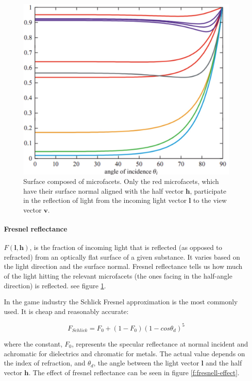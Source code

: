 \begin{figure}
\sidecaption
	\includegraphics[width=.65\textwidth]{graphics/gi/ray-optics-11}
	\caption{Surface composed of microfacets. Only the red microfacets, which have their surface normal aligned with the half vector $\mathbf{h}$, participate in the reflection of light from the incoming light vector $\mathbf{l}$ to the view vector $\mathbf{v}$.}
	\label{f:Fresnel-reflection}
\end{figure}


\paragraph{\textbf{Fresnel reflectance}} $F(\mathbf{l},\mathbf{h})$, is the fraction of incoming light that is reflected (as opposed to refracted) from an optically flat surface of a given substance. It varies based on the light direction and the surface normal. Fresnel reflectance tells us how much of the light hitting the relevant microfacets (the ones facing in the half-angle direction) is reflected. see figure \ref{f:Fresnel-reflection}.

In the game industry the Schlick Fresnel approximation\cite[-5mm]{a:AnInexpensiveBRDFModelforPhysically-BasedRendering} is the most commonly used. It is cheap and reasonably accurate:

\begin{equation}
	F_{Schlick}=F_0 +(1-F_0)(1-cos\theta_d)^5
\end{equation}  

where the constant, $F_0$,  represents the specular reflectance at normal incident and achromatic for dielectrics and chromatic for metals. The actual value depends on the index of refraction, and $\theta_d$, the angle between the light vector $\mathbf{l}$ and the half vector $\mathbf{h}$. The effect of fresnel reflectance can be seen in figure \ref{f:fresnell-effect}.

